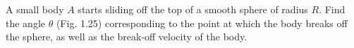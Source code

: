 \item A small body \( A \) starts sliding off the top of a smooth sphere of radius \( R \). Find the angle \( \theta \) (Fig. 1.25) corresponding to the point at which the body breaks off the sphere, as well as the break-off velocity of the body.
    \begin{center}
    \end{center}
